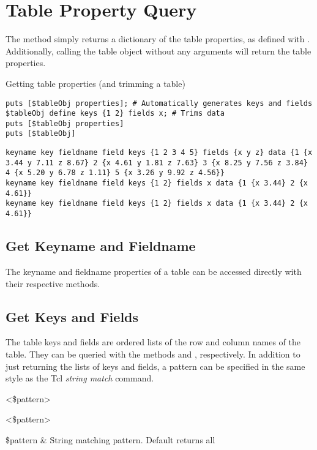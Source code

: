 \section{Table Property Query}
The method  simply returns a dictionary of the table properties, as defined with .
Additionally, calling the table object without any arguments will return the table properties.
\begin{syntax}
\end{syntax}
\begin{example}{Getting table properties (and trimming a table)}
\begin{lstlisting}
puts [$tableObj properties]; # Automatically generates keys and fields
$tableObj define keys {1 2} fields x; # Trims data
puts [$tableObj properties]
puts [$tableObj]
\end{lstlisting}
\tcblower
\begin{lstlisting}
keyname key fieldname field keys {1 2 3 4 5} fields {x y z} data {1 {x 3.44 y 7.11 z 8.67} 2 {x 4.61 y 1.81 z 7.63} 3 {x 8.25 y 7.56 z 3.84} 4 {x 5.20 y 6.78 z 1.11} 5 {x 3.26 y 9.92 z 4.56}}
keyname key fieldname field keys {1 2} fields x data {1 {x 3.44} 2 {x 4.61}}
keyname key fieldname field keys {1 2} fields x data {1 {x 3.44} 2 {x 4.61}}
\end{lstlisting}
\end{example}

\subsection{Get Keyname and Fieldname}
The keyname and fieldname properties of a table can be accessed directly with their respective methods. 
\begin{syntax}
\end{syntax}
\begin{syntax}
\end{syntax}
\subsection{Get Keys and Fields}
The table keys and fields are ordered lists of the row and column names of the table. They can be queried with the methods  and , respectively. In addition to just returning the lists of keys and fields, a pattern can be specified in the same style as the Tcl  \textit{string match} command.
\begin{syntax}
 <\$pattern>
\end{syntax}
\begin{syntax}
 <\$pattern>
\end{syntax}
\begin{args}
\$pattern & String matching pattern. Default returns all
\end{args}
\clearpage

